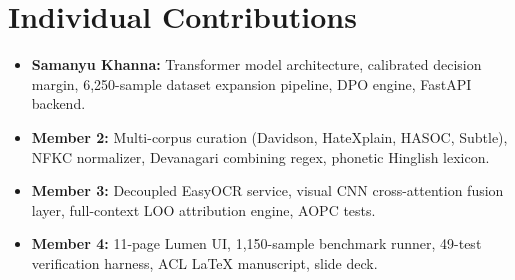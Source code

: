 \documentclass[10pt,twocolumn]{article}
\begin{document}
\section{Individual Contributions}
\begin{itemize}
    \item \textbf{Samanyu Khanna:} Transformer model architecture, calibrated decision margin, 6,250-sample dataset expansion pipeline, DPO engine, FastAPI backend.
    \item \textbf{Member 2:} Multi-corpus curation (Davidson, HateXplain, HASOC, Subtle), NFKC normalizer, Devanagari combining regex, phonetic Hinglish lexicon.
    \item \textbf{Member 3:} Decoupled EasyOCR service, visual CNN cross-attention fusion layer, full-context LOO attribution engine, AOPC tests.
    \item \textbf{Member 4:} 11-page Lumen UI, 1,150-sample benchmark runner, 49-test verification harness, ACL LaTeX manuscript, slide deck.
\end{itemize}
\end{document}
